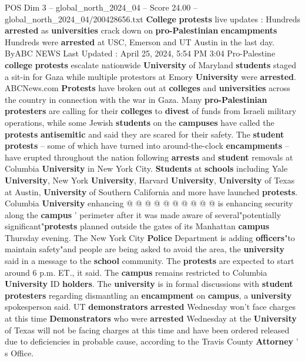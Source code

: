 \begin{textsample}{POS Dim 3 – global\_north\_2024\_04 – Score 24.00 – global\_north\_2024\_04/200428656.txt}  \label{ex:f3_pos_080}
\textbf{College} \textbf{protests} live updates : Hundreds \textbf{arrested} as \textbf{universities} crack down on \textbf{pro-Palestinian} \textbf{encampments} Hundreds were \textbf{arrested} at USC, Emerson and UT Austin in the last day.
ByABC NEWS Last Updated : April 25, 2024, 5:54 PM 3:04 Pro-Palestine \textbf{college} \textbf{protests} escalate nationwide \textbf{University} of Maryland \textbf{students} staged a sit-in for Gaza while multiple protestors at Emory \textbf{University} were \textbf{arrested}.
ABCNews.com \textbf{Protests} have broken out at \textbf{colleges} and \textbf{universities} across the country in connection with the war in Gaza.
Many \textbf{pro-Palestinian} \textbf{protesters} are calling for their \textbf{colleges} to \textbf{divest} of funds from Israeli military operations, while some Jewish \textbf{students} on the \textbf{campuses} have called the \textbf{protests} \textbf{antisemitic} and said they are scared for their safety.
The \textbf{student} \textbf{protests} -- some of which have turned into around-the-clock \textbf{encampments} -- have erupted throughout the nation following \textbf{arrests} and \textbf{student} removals at Columbia \textbf{University} in New York City. \textbf{Students} at \textbf{schools} including Yale \textbf{University}, New York \textbf{University}, Harvard \textbf{University}, \textbf{University} of Texas at Austin, \textbf{University} of Southern California and more have launched \textbf{protests}.
Columbia \textbf{University} enhancing @ @ @ @ @ @ @ @ @ @ is enhancing security along the \textbf{campus} ' perimeter after it was made aware of several"potentially significant"\textbf{protests} planned outside the gates of its Manhattan \textbf{campus} Thursday evening.
The New York City \textbf{Police} Department is adding \textbf{officers}"to maintain safety"and people are being asked to avoid the area, the \textbf{university} said in a message to the \textbf{school} community.
The \textbf{protests} are expected to start around 6 p.m.
ET., it said.
The \textbf{campus} remains restricted to Columbia \textbf{University} ID \textbf{holders}.
The \textbf{university} is in formal discussions with \textbf{student} \textbf{protesters} regarding dismantling an \textbf{encampment} on \textbf{campus}, a \textbf{university} spokesperson said.
UT \textbf{demonstrators} \textbf{arrested} Wednesday won't face charges at this time \textbf{Demonstrators} who were \textbf{arrested} Wednesday at the \textbf{University} of Texas will not be facing charges at this time and have been ordered released due to deficiencies in probable cause, according to the Travis County \textbf{Attorney} ' s Office.

\end{textsample}
